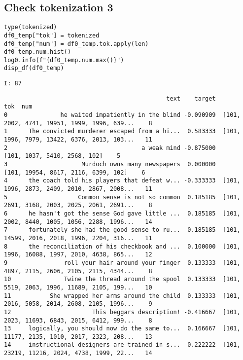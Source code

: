 \documentclass[a4paper,10pt,onecolumn,oneside,openright]{article}
\begin{document}
\subsection{Check tokenization 3}
\label{sec:orgbc1849a}
\begin{verbatim}
type(tokenized)
df0_temp["tok"] = tokenized
df0_temp["num"] = df0_temp.tok.apply(len)
df0_temp.num.hist()
log0.info(f"{df0_temp.num.max()}")
disp_df(df0_temp)
\end{verbatim}

\begin{verbatim}
I: 87
\end{verbatim}

\begin{verbatim}
                                              text    target                                          tok  num
0               he waited impatiently in the blind -0.090909  [101, 2002, 4741, 19951, 1999, 1996, 639...    8
1      The convicted murderer escaped from a hi...  0.583333  [101, 1996, 7979, 13422, 6376, 2013, 103...   11
2                                      a weak mind -0.875000                 [101, 1037, 5410, 2568, 102]    5
3                     Murdoch owns many newspapers  0.000000          [101, 19954, 8617, 2116, 6399, 102]    6
4      the coach told his players that defeat w... -0.333333  [101, 1996, 2873, 2409, 2010, 2867, 2008...   11
5                    Common sense is not so common  0.185185  [101, 2691, 3168, 2003, 2025, 2061, 2691...    8
6      he hasn't got the sense God gave little ...  0.185185  [101, 2002, 8440, 1005, 1056, 2288, 1996...   14
7      fortunately she had the good sense to ru...  0.185185  [101, 14599, 2016, 2018, 1996, 2204, 316...   11
8      the reconciliation of his checkbook and ...  0.100000  [101, 1996, 16088, 1997, 2010, 4638, 865...   12
9                roll your hair around your finger  0.133333  [101, 4897, 2115, 2606, 2105, 2115, 4344...    8
10               Twine the thread around the spool  0.133333  [101, 5519, 2063, 1996, 11689, 2105, 199...   10
11           She wrapped her arms around the child  0.133333  [101, 2016, 5058, 2014, 2608, 2105, 1996...    9
12                       This beggars description! -0.416667  [101, 2023, 11693, 6843, 2015, 6412, 999...    8
13     logically, you should now do the same to...  0.166667  [101, 11177, 2135, 1010, 2017, 2323, 208...   13
14     instructional designers are trained in s...  0.222222  [101, 23219, 11216, 2024, 4738, 1999, 22...   14

\end{verbatim}
\end{document}
